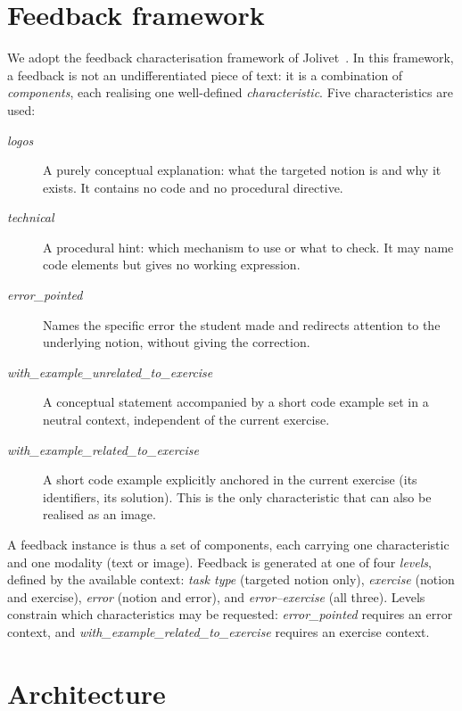 \documentclass[10pt]{article}
\newcommand{\charac}[1]{\textit{#1}}
\begin{document}
\section{Feedback framework}
\label{sec:framework}

We adopt the feedback characterisation framework of Jolivet~\cite{jolivet}. %
In this framework, a feedback is not an undifferentiated piece of text: it is a combination of \emph{components}, each realising one well-defined \emph{characteristic}. Five characteristics are used:

\begin{description}
  \item[\charac{logos}] A purely conceptual explanation: what the targeted notion is and why it exists. It contains no code and no procedural directive.
  \item[\charac{technical}] A procedural hint: which mechanism to use or what to check. It may name code elements but gives no working expression.
  \item[\charac{error\_pointed}] Names the specific error the student made and redirects attention to the underlying notion, without giving the correction.
  \item[\charac{with\_example\_unrelated\_to\_exercise}] A conceptual statement accompanied by a short code example set in a neutral context, independent of the current exercise.
  \item[\charac{with\_example\_related\_to\_exercise}] A short code example explicitly anchored in the current exercise (its identifiers, its solution). This is the only characteristic that can also be realised as an image.
\end{description}

A feedback instance is thus a set of components, each carrying one characteristic and one modality (text or image). Feedback is generated at one of four \emph{levels}, defined by the available context: \emph{task type} (targeted notion only), \emph{exercise} (notion and exercise), \emph{error} (notion and error), and \emph{error--exercise} (all three). Levels constrain which characteristics may be requested: \charac{error\_pointed} requires an error context, and \charac{with\_example\_related\_to\_exercise} requires an exercise context.

\section{Architecture}
\label{sec:architecture}
\end{document}
